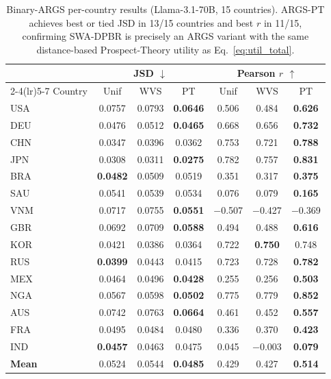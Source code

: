 \documentclass{article}
\begin{document}
\begin{table}[h]\centering\scriptsize
\caption{Binary-ARGS per-country results (Llama-3.1-70B, 15 countries).
\textsc{ARGS-PT} achieves best or tied JSD in 13/15 countries and best $r$ in
11/15, confirming SWA-DPBR is precisely an ARGS variant with the same
distance-based Prospect-Theory utility as Eq.~\ref{eq:util_total}.}
\label{tab:args_percountry}
\begin{tabular}{lcccccc}\toprule
 & \multicolumn{3}{c}{JSD $\downarrow$} & \multicolumn{3}{c}{Pearson $r$ $\uparrow$}\\
\cmidrule(lr){2-4}\cmidrule(lr){5-7}
Country & Unif & WVS & PT & Unif & WVS & PT \\\midrule
USA & 0.0757 & 0.0793 & \textbf{0.0646} & 0.506 & 0.484 & \textbf{0.626} \\
DEU & 0.0476 & 0.0512 & \textbf{0.0465} & 0.668 & 0.656 & \textbf{0.732} \\
CHN & 0.0347 & 0.0396 & 0.0362 & 0.753 & 0.721 & \textbf{0.788} \\
JPN & 0.0308 & 0.0311 & \textbf{0.0275} & 0.782 & 0.757 & \textbf{0.831} \\
BRA & \textbf{0.0482} & 0.0509 & 0.0519 & 0.351 & 0.317 & \textbf{0.375} \\
SAU & 0.0541 & 0.0539 & 0.0534 & 0.076 & 0.079 & \textbf{0.165} \\
VNM & 0.0717 & 0.0755 & \textbf{0.0551} & $-$0.507 & $-$0.427 & $-$0.369 \\
GBR & 0.0692 & 0.0709 & \textbf{0.0588} & 0.494 & 0.488 & \textbf{0.616} \\
KOR & 0.0421 & 0.0386 & 0.0364 & 0.722 & \textbf{0.750} & 0.748 \\
RUS & \textbf{0.0399} & 0.0443 & 0.0415 & 0.723 & 0.728 & \textbf{0.782} \\
MEX & 0.0464 & 0.0496 & \textbf{0.0428} & 0.255 & 0.256 & \textbf{0.503} \\
NGA & 0.0567 & 0.0598 & \textbf{0.0502} & 0.775 & 0.779 & \textbf{0.852} \\
AUS & 0.0742 & 0.0763 & \textbf{0.0664} & 0.461 & 0.452 & \textbf{0.557} \\
FRA & 0.0495 & 0.0484 & 0.0480 & 0.336 & 0.370 & \textbf{0.423} \\
IND & \textbf{0.0457} & 0.0463 & 0.0475 & 0.045 & $-$0.003 & \textbf{0.079} \\\midrule
\textbf{Mean} & 0.0524 & 0.0544 & \textbf{0.0485} & 0.429 & 0.427 & \textbf{0.514} \\\bottomrule
\end{tabular}
\end{table}
\end{document}
